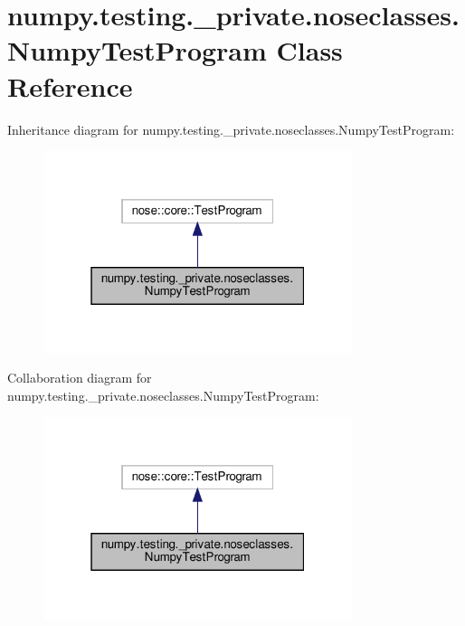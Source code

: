 \hypertarget{classnumpy_1_1testing_1_1__private_1_1noseclasses_1_1NumpyTestProgram}{}\section{numpy.\+testing.\+\_\+private.\+noseclasses.\+Numpy\+Test\+Program Class Reference}
\label{classnumpy_1_1testing_1_1__private_1_1noseclasses_1_1NumpyTestProgram}


Inheritance diagram for numpy.\+testing.\+\_\+private.\+noseclasses.\+Numpy\+Test\+Program\+:
\nopagebreak
\begin{figure}[H]
\begin{center}
\leavevmode
\includegraphics[width=256pt]{classnumpy_1_1testing_1_1__private_1_1noseclasses_1_1NumpyTestProgram__inherit__graph}
\end{center}
\end{figure}


Collaboration diagram for numpy.\+testing.\+\_\+private.\+noseclasses.\+Numpy\+Test\+Program\+:
\nopagebreak
\begin{figure}[H]
\begin{center}
\leavevmode
\includegraphics[width=256pt]{classnumpy_1_1testing_1_1__private_1_1noseclasses_1_1NumpyTestProgram__coll__graph}
\end{center}
\end{figure}
